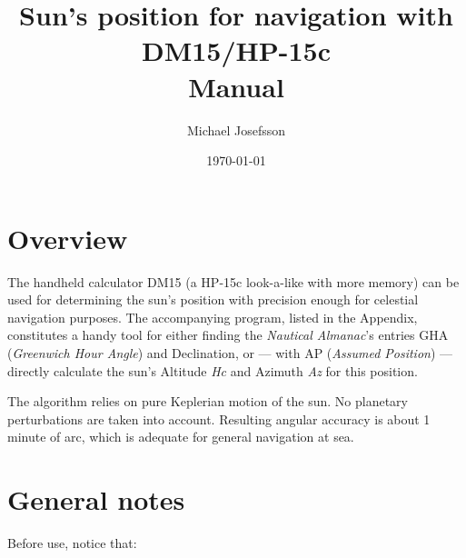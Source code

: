 \documentclass[english,a4paper,onepage, 12pt]{scrbook}
\begin{document}
\newcommand{\tavla}[1]{\reversemarginpar{ \rule[-10mm]{0.1mm}{#1cm}}}
\newcommand{\svarsrad}{\begin{flushright} \rule{7cm}{0.2mm} \end{flushright}}
\newcommand{\asm}[1]{\texttt{\textbf{#1}}}

\newcommand{\startex}[1]{\textbf{Example}\begin{quote}#1\end{quote}}
\newcommand{\slutex}{\begin{flushright}\rule{1ex}{1ex}\end{flushright}}


\title{Sun's position for navigation with DM15/HP-15c\\{}Manual\\{}}

\author{Michael Josefsson}
\date{\today}
\maketitle
\tableofcontents

\addtolength{\evensidemargin}{-2.0cm}
\addtolength{\oddsidemargin}{2.0cm}
\setcounter{chapter}{1}

\newpage
\section{Overview}

The handheld calculator DM15 (a HP-15c look-a-like with more memory) can be used for determining the sun's position with precision enough for celestial navigation purposes. The accompanying program, listed in the Appendix, constitutes a handy tool for either finding the \emph{Nautical Almanac}'s entries GHA (\emph{Greenwich Hour Angle}) and Declination, or --- with AP (\emph{Assumed Position}) --- directly calculate the sun's Altitude \emph{Hc} and Azimuth \emph{Az} for this position.

The algorithm relies on pure Keplerian motion of the sun. No planetary perturbations are taken into account. Resulting angular accuracy is about 1 minute of arc, which is adequate for general navigation at sea.

\section{General notes} 

Before use, notice that: 
\end{document}
